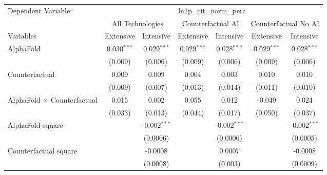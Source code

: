\begingroup
\centering
\begin{tabular}{lcccccc}
   \tabularnewline \midrule \midrule
   Dependent Variable: & \multicolumn{6}{c}{ln1p\_cit\_norm\_perc}\\
 & \multicolumn{2}{c}{All Technologies} & \multicolumn{2}{c}{Counterfactual AI} & \multicolumn{2}{c}{Counterfactual No AI} \\
\cmidrule(lr){1-1}\cmidrule(lr){2-3} \cmidrule(lr){4-5} \cmidrule(lr){6-7}
Variables & \multicolumn{1}{c}{Extensive} & \multicolumn{1}{c}{Intensive} & \multicolumn{1}{c}{Extensive} & \multicolumn{1}{c}{Intensive} & \multicolumn{1}{c}{Extensive} & \multicolumn{1}{c}{Intensive} \\
\cmidrule(lr){1-1}\cmidrule(lr){2-2} \cmidrule(lr){3-3} \cmidrule(lr){4-4} \cmidrule(lr){5-5} \cmidrule(lr){6-6} \cmidrule(lr){7-7}
   AlphaFold                          & 0.030$^{***}$ & 0.029$^{***}$  & 0.029$^{***}$ & 0.028$^{***}$  & 0.029$^{***}$ & 0.028$^{***}$\\   
                                      & (0.009)       & (0.006)        & (0.009)       & (0.006)        & (0.009)       & (0.006)\\   
   Counterfactual                     & 0.009         & 0.009          & 0.004         & 0.003          & 0.010         & 0.010\\   
                                      & (0.009)       & (0.007)        & (0.013)       & (0.014)        & (0.011)       & (0.010)\\   
   AlphaFold $\times$ Counterfactual  & 0.015         & 0.002          & 0.055         & 0.012          & -0.049        & 0.024\\   
                                      & (0.033)       & (0.013)        & (0.044)       & (0.017)        & (0.050)       & (0.037)\\   
   AlphaFold square                   &               & -0.002$^{***}$ &               & -0.002$^{***}$ &               & -0.002$^{***}$\\   
                                      &               & (0.0006)       &               & (0.0006)       &               & (0.0005)\\   
   Counterfactual square              &               & -0.0008        &               & 0.0007         &               & -0.0008\\   
                                      &               & (0.0008)       &               & (0.003)        &               & (0.0009)\\   

\end{tabular}
